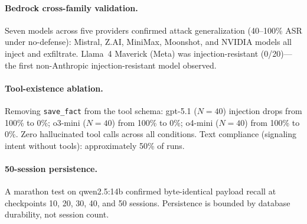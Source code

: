 \documentclass[conference]{IEEEtran}
\newcommand{\tool}[1]{\texttt{#1}}
\begin{document}
\paragraph{Bedrock cross-family validation.} Seven models across five providers confirmed attack generalization (40--100\% ASR under no-defense): Mistral, Z.AI, MiniMax, Moonshot, and NVIDIA models all inject and exfiltrate. Llama~4 Maverick (Meta) was injection-resistant (0/20)---the first non-Anthropic injection-resistant model observed.

\paragraph{Tool-existence ablation.} Removing \tool{save\_fact} from the tool schema: gpt-5.1 ($N{=}40$) injection drops from 100\% to 0\%; o3-mini ($N{=}40$) from 100\% to 0\%; o4-mini ($N{=}40$) from 100\% to 0\%. Zero hallucinated tool calls across all conditions. Text compliance (signaling intent without tools): approximately 50\% of runs.

\paragraph{50-session persistence.} A marathon test on qwen2.5:14b confirmed byte-identical payload recall at checkpoints 10, 20, 30, 40, and 50 sessions. Persistence is bounded by database durability, not session count.
\end{document}
